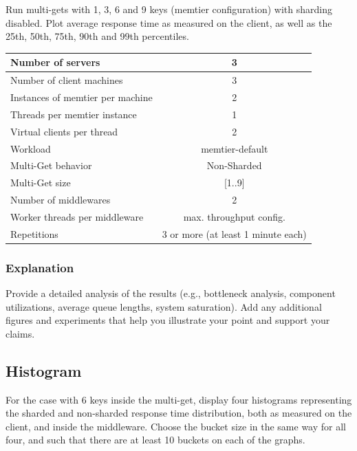 \documentclass[11pt,a4paper]{article}
\begin{document}
Run multi-gets with 1, 3, 6 and 9 keys (memtier configuration) with sharding disabled. Plot average response time as measured on the client, as well as the 25th, 50th, 75th, 90th and 99th percentiles.

\begin{center}
	\scriptsize{
		\begin{tabular}{|l|c|}
			\hline Number of servers                & 3                       \\ 
			\hline Number of client machines        & 3                       \\ 
			\hline Instances of memtier per machine & 2                       \\ 
			\hline Threads per memtier instance     & 1                       \\
			\hline Virtual clients per thread       & 2                		 \\ 
			\hline Workload                         & memtier-default             \\
			\hline Multi-Get behavior               & Non-Sharded             \\
			\hline Multi-Get size                   & [1..9]                  \\
			\hline Number of middlewares            & 2                       \\
			\hline Worker threads per middleware    & max. throughput config. \\
			\hline Repetitions                      & 3 or more (at least 1 minute each)               \\ 
			\hline 
		\end{tabular}
	} 
\end{center}

\subsubsection{Explanation}

Provide a detailed analysis of the results (e.g., bottleneck analysis, component utilizations, average queue lengths, system saturation). Add any additional figures and experiments that help you illustrate your point and support your claims.

\subsection{Histogram}

For the case with 6 keys inside the multi-get, display four histograms representing the sharded and non-sharded response time distribution, both as measured on the client, and inside the middleware. Choose the bucket size in the same way for all four, and such that there are at least 10 buckets on each of the graphs.
\end{document}
